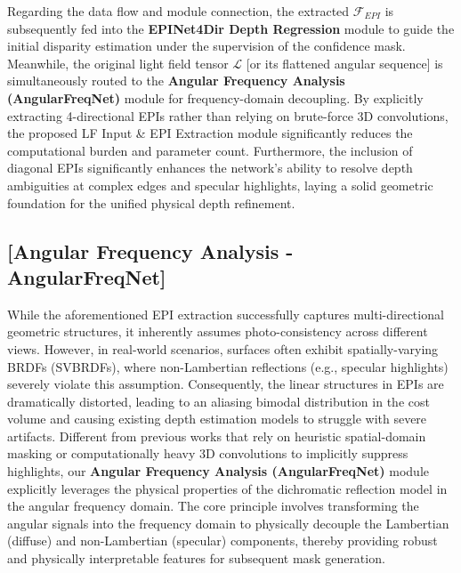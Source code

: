 Regarding the data flow and module connection, the extracted $\mathcal{F}_{EPI}$ is subsequently fed into the \textbf{EPINet4Dir Depth Regression} module to guide the initial disparity estimation under the supervision of the confidence mask. Meanwhile, the original light field tensor $\mathcal{L}$  [or its flattened angular sequence] is simultaneously routed to the \textbf{Angular Frequency Analysis (AngularFreqNet)} module for frequency-domain decoupling. By explicitly extracting 4-directional EPIs rather than relying on brute-force 3D convolutions, the proposed LF Input \& EPI Extraction module significantly reduces the computational burden and parameter count. Furthermore, the inclusion of diagonal EPIs significantly enhances the network's ability to resolve depth ambiguities at complex edges and specular highlights, laying a solid geometric foundation for the unified physical depth refinement.

\subsection{ [Angular Frequency Analysis - AngularFreqNet]}

While the aforementioned EPI extraction successfully captures multi-directional geometric structures, it inherently assumes photo-consistency across different views. However, in real-world scenarios, surfaces often exhibit spatially-varying BRDFs (SVBRDFs), where non-Lambertian reflections (e.g., specular highlights) severely violate this assumption. Consequently, the linear structures in EPIs are dramatically distorted, leading to an aliasing bimodal distribution in the cost volume and causing existing depth estimation models to struggle with severe artifacts. Different from previous works that rely on heuristic spatial-domain masking or computationally heavy 3D convolutions to implicitly suppress highlights, our \textbf{Angular Frequency Analysis (AngularFreqNet)} module explicitly leverages the physical properties of the dichromatic reflection model in the angular frequency domain. The core principle involves transforming the angular signals into the frequency domain to physically decouple the Lambertian (diffuse) and non-Lambertian (specular) components, thereby providing robust and physically interpretable features for subsequent mask generation.

